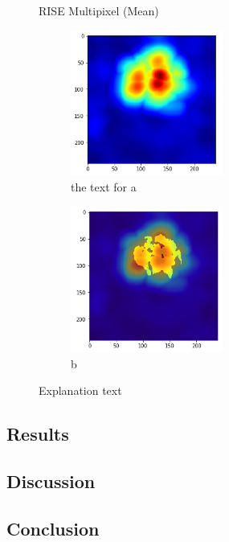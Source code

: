 \begin{figure}[H]
\centering
\caption{RISE Multipixel (Mean)}
\begin{subfigure}{.5\textwidth}
  \centering
  \includegraphics[width=5cm]{chapters/04_segmentation/images/rise_multipixel_max_1-0.png}
  \caption{ the text for a}
\end{subfigure}%
\begin{subfigure}{.5\textwidth}
  \centering
  \includegraphics[width=5cm]{chapters/04_segmentation/images/rise_multipixel_max_1-1.png}
  \caption{b}
\end{subfigure}

\caption{Explanation text}
\end{figure}

\subsection{Results}

\subsection{Discussion}

\subsection{Conclusion}
